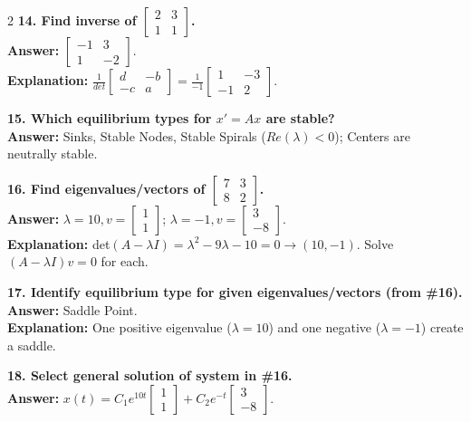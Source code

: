 \documentclass[4pt]{extarticle}
\begin{document}
\begin{multicols}{2}
\textbf{14. Find inverse of $\begin{bmatrix} 2 & 3 \\ 1 & 1 \end{bmatrix}$.} \\
\textbf{Answer:} $\begin{bmatrix} -1 & 3 \\ 1 & -2 \end{bmatrix}$. \\
\textbf{Explanation:} $\frac{1}{det} \begin{bmatrix} d & -b \\ -c & a \end{bmatrix} = \frac{1}{-1} \begin{bmatrix} 1 & -3 \\ -1 & 2 \end{bmatrix}$.

\textbf{15. Which equilibrium types for $x'=Ax$ are stable?} \\
\textbf{Answer:} Sinks, Stable Nodes, Stable Spirals ($Re(\lambda) < 0$); Centers are neutrally stable.

\textbf{16. Find eigenvalues/vectors of $\begin{bmatrix} 7 & 3 \\ 8 & 2 \end{bmatrix}$.} \\
\textbf{Answer:} $\lambda=10, v=\begin{bmatrix} 1 \\ 1 \end{bmatrix}$; $\lambda=-1, v=\begin{bmatrix} 3 \\ -8 \end{bmatrix}$. \\
\textbf{Explanation:} det$(A-\lambda I) = \lambda^2 - 9\lambda - 10 = 0 \rightarrow (10, -1)$. Solve $(A-\lambda I)v=0$ for each.

\textbf{17. Identify equilibrium type for given eigenvalues/vectors (from \#16).} \\
\textbf{Answer:} Saddle Point. \\
\textbf{Explanation:} One positive eigenvalue ($\lambda=10$) and one negative ($\lambda=-1$) create a saddle.

\textbf{18. Select general solution of system in \#16.} \\
\textbf{Answer:} $x(t) = C_1e^{10t}\begin{bmatrix} 1 \\ 1 \end{bmatrix} + C_2e^{-t}\begin{bmatrix} 3 \\ -8 \end{bmatrix}$.


\end{multicols}
\end{document}
